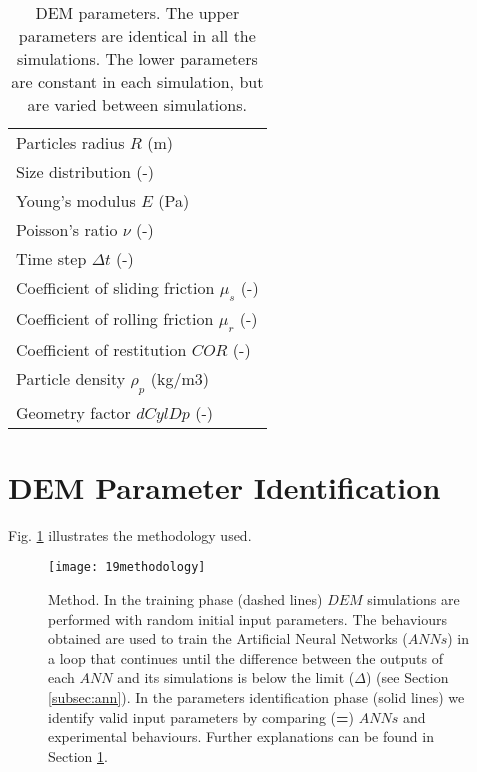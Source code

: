 \documentclass[review]{elsarticle}
\begin{document}
%
\begin{table}[h]
\centering
\begin{tabular}{l}
\hline 
     Particles radius $R$ (m)   \\ [5pt]

	Size distribution (-) \\ [5pt]

    Young's modulus $E$ (Pa)  \\ [5pt]

    Poisson's ratio $\nu$ (-) \\ 
     Time step $\Delta t$ (-) \\ [5pt]
        \hline
     Coefficient of sliding friction $\mu_s$ (-)\\  [5pt]
    Coefficient of rolling friction $\mu_r$ (-) \\ [5pt]
    Coefficient of restitution $COR$ (-)   \\ [5pt]
     Particle density $\rho_p$ (kg/m3)  \\ [5pt]
    Geometry factor $dCylDp$ (-)  \\ [5pt]
   
\hline
\end{tabular}
\caption[DEM parameters]{DEM parameters. The upper parameters are
identical in all the simulations. The lower parameters are constant in each
simulation, but are varied between simulations.}
\label{tab:08DEMparameters}
\end{table}

\section{DEM Parameter Identification}
\label{sec:methodology}

Fig. \ref{fig:19methodology} illustrates the methodology used.

\begin{figure}[!htb] 
\centering 
\texttt{[image: 19methodology]} 
\caption[Method]{Method. 
In the training phase (dashed lines)
$DEM$ simulations are performed
with random initial input parameters.
The behaviours obtained are used to train the
Artificial Neural Networks ($ANNs$) in a loop that continues until the
difference between the outputs of each $ANN$ and its simulations is below the
limit ($\Delta$) (see Section \ref{subsec:ann}).
In the parameters identification phase (solid
lines) we identify valid input parameters by comparing (\textbf{=}) $ANNs$ and
experimental behaviours.
Further explanations can be found in Section \ref{sec:methodology}.
}
\label{fig:19methodology} 
\end{figure}
\end{document}
